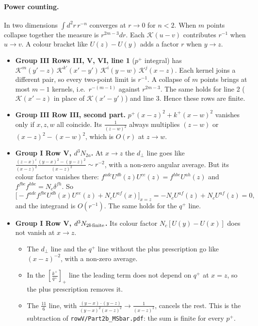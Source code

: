 \documentclass[10pt]{article}
\newcommand{\KK}{\mathcal K}
\begin{document}
\paragraph{Power counting.} In two dimensions $\int d^2r\,r^{-n}$ converges at $r\to0$ for $n<2$. When $m$ points collapse together the measure is $r^{2m-3}dr$. Each $\KK(u-v)$ contributes $r^{-1}$ when $u\to v$. A colour bracket like $U(z)-U(y)$ adds a factor $r$ when $y\to z$.
\begin{itemize}
\item \textbf{Group III Rows III, V, VI, line 1} ($p^+$ integral) has $\KK^m(y'-z)\,\KK^{k'}(x'-y')\,\KK^i(y-w)\,\KK^j(x-z)$. Each kernel joins a different pair, so every two-point limit is $r^{-1}$. A collapse of $m$ points brings at most $m-1$ kernels, i.e.\ $r^{-(m-1)}$ against $r^{2m-3}$. The same holds for line 2 ($\KK(x'-z)$ in place of $\KK(x'-y')$) and line 3. Hence these rows are finite.
\item \textbf{Group III Row III, second part.} $p^+(x-z)^2+k^+(x-w)^2$ vanishes only if $x,z,w$ all coincide. Its $\frac{1}{(z-w)^2}$ always multiplies $(z-w)$ or $(x-z)^2-(x-w)^2$, which is $O(r)$ at $z\to w$.
\item \textbf{Group I Row V, $d^3N_{2a}$.} At $x\to z$ the $d_\perp$ line goes like $\frac{(z-x)^i}{(x-z)^2}\frac{(y-x)^2-(y-z)^2}{(x-z)^2}\sim r^{-2}$, with a non-zero angular average. But its colour factor vanishes there: $f^{adc}U^{db}(z)U^{ce}(z)=f^{hbe}U^{ah}(z)$ and $f^{fbe}f^{hbe}=N_c\delta^{fh}$. So
\begin{equation*}
\big[-f^{adc}f^{fbe}U^{db}(x)U^{ce}(z)+N_cU^{af}(x)\big]_{x=z}=-N_cU^{af}(z)+N_cU^{af}(z)=0,
\end{equation*}
and the integrand is $O(r^{-1})$. The same holds for the $q^+$ line.
\item \textbf{Group I Row V, $d^3N_{2b\,\rm finite}$.} Its colour factor $N_c[U(y)-U(x)]$ does not vanish at $x\to z$.
\begin{itemize}
\item The $d_\perp$ line and the $q^+$ line without the plus prescription go like $(x-z)^{-2}$, with a non-zero average.
\item In the $[\frac{k^+}{q^+}]_+$ line the leading term does not depend on $q^+$ at $x=z$, so the plus prescription removes it.
\item The $\frac{11}{6}$ line, with $\frac{(y-x)\cdot(y-z)}{(y-x)^2(x-z)^2}\to\frac{1}{(x-z)^2}$, cancels the rest. This is the subtraction of \texttt{rowV/Part2b\_MSbar.pdf}: the sum is finite for every $p^+$.
\end{itemize}
\end{itemize}
\end{document}
